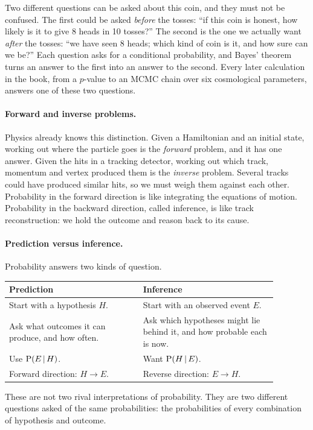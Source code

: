 Two different questions can be asked about this coin, and they must not be
confused. The first could be asked \emph{before} the tosses: ``if this coin is
honest, how likely is it to give 8 heads in 10 tosses?'' The second is the one
we actually want \emph{after} the tosses: ``we have seen 8 heads; which kind of
coin is it, and how sure can we be?'' Each question asks for a conditional
probability, and Bayes' theorem turns an answer to the first into an answer to
the second. Every later calculation in the book, from a $p$-value to an MCMC
chain over six cosmological parameters, answers one of these two questions.

\paragraph{Forward and inverse problems.}
Physics already knows this distinction. Given a Hamiltonian and an initial
state, working out where the particle goes is the \emph{forward} problem, and
it has one answer. Given the hits in a tracking detector, working out which
track, momentum and vertex produced them is the \emph{inverse} problem.
Several tracks could have produced similar hits, so we must weigh them against
each other. Probability in the forward direction is like integrating the
equations of motion. Probability in the backward direction, called inference,
is like track reconstruction: we hold the outcome and reason back to its cause.

\paragraph{Prediction versus inference.}
Probability answers two kinds of question.
\begin{center}
\small
\begin{tabular}{@{}p{0.44\linewidth}p{0.44\linewidth}@{}}
\toprule
\textbf{Prediction} & \textbf{Inference}\\
\midrule
Start with a hypothesis $H$. & Start with an observed event $E$.\\
Ask what outcomes it can produce, and how often. & Ask which hypotheses might lie behind it, and how probable each is now.\\
Use $\operatorname{P}(E\,\vert\, H)$. & Want $\operatorname{P}(H\,\vert\, E)$.\\
Forward direction: $H\to E$. & Reverse direction: $E\to H$.\\
\bottomrule
\end{tabular}
\end{center}
These are not two rival interpretations of probability. They are two
different questions asked of the same probabilities: the probabilities of
every combination of hypothesis and outcome.

